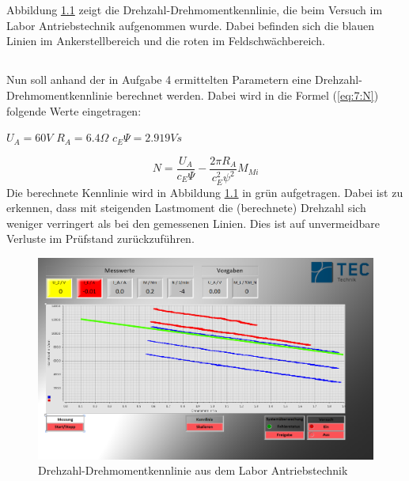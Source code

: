 \chapter{}

\section{}

Abbildung \ref{fig:7:kennlinie} zeigt die Drehzahl-Drehmomentkennlinie, die beim Versuch im Labor Antriebstechnik aufgenommen wurde. Dabei befinden sich die blauen Linien im Ankerstellbereich und die roten im Feldschwächbereich.

\section{}
Nun soll anhand der in Aufgabe 4 ermittelten Parametern eine Drehzahl-Drehmomentkennlinie berechnet werden. Dabei wird in die Formel (\ref{eq:7:N}) folgende Werte eingetragen:
\begin{center}
	$ U_{A} = 60V $ \hspace{1.5cm}	$ R_{A} = 6.4\Omega $ \hspace{1.5cm}	$ c_{E}\Psi = 2.919Vs$
\end{center}
\begin{equation}
	N = \frac{U_{A}}{c_{E}\Psi} - \frac{2\pi R_{A}}{c_{E}^{2}\psi^{2}}M_{Mi}
	\label{eq:7:N}
\end{equation}
Die berechnete Kennlinie wird in Abbildung \ref{fig:7:kennlinie} in grün aufgetragen. Dabei ist zu erkennen, dass mit steigenden Lastmoment die (berechnete) Drehzahl sich weniger verringert als bei den gemessenen Linien. Dies ist auf unvermeidbare Verluste im Prüfstand zurückzuführen.

\begin{figure}[h]
	\centering 
	\includegraphics[width=\textwidth]{./bilder/kennlinie.png}
	\caption{Drehzahl-Drehmomentkennlinie aus dem Labor Antriebstechnik}
	\label{fig:7:kennlinie}
\end{figure}